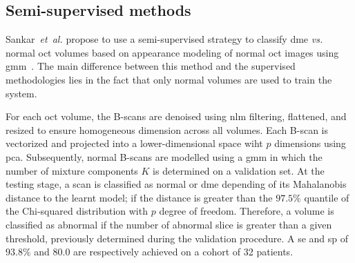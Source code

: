 \subsection{Semi-supervised methods}

Sankar~\textit{et~al.} propose to use a semi-supervised strategy to classify \gls{dme} \emph{vs.} normal \gls{oct} volumes based on appearance modeling of normal \gls{oct} images using \gls{gmm}~\cite{sankar2016classification}.
The main difference between this method and the supervised methodologies lies in the fact that only normal volumes are used to train the system.

For each \gls{oct} volume, the B-scans are denoised using \gls{nlm} filtering, flattened, and resized to ensure homogeneous dimension across all volumes.
Each B-scan is vectorized and projected into a lower-dimensional space wiht $p$ dimensions using \gls{pca}.
Subsequently, normal B-scans are modelled using a \gls{gmm} in which the number of mixture components $K$ is determined on a validation set.
At the testing stage, a scan is classified as normal or \gls{dme} depending of its Mahalanobis distance to the learnt model; if the distance is greater than the $97.5 \%$ quantile of the Chi-squared distribution with $p$ degree of freedom.
Therefore, a volume is classified as abnormal if the number of abnormal slice is greater than a given threshold, previously determined during the validation procedure.
A \gls{se} and \gls{sp} of $93.8 \%$ and $80.0$ are respectively achieved on a cohort of 32 patients.
